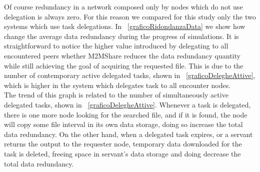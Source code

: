 Of course redundancy in a network composed only by nodes which do not use delegation is always zero. For this reason we compared for this study only the two systems which use task delegations. In \figurename~\ref{graficoRidondanzaData} we show how change the average data redundancy during the progress of simulations. It is straightforward to notice the higher value introduced by delegating to all encountered peers whether M2MShare reduces the data redundancy quantity while still achieving the goal of acquiring the requested file. This is due to the number of contemporary active delegated tasks, shown in \figurename~\ref{graficoDelegheAttive}, which is higher in the system which delegates task to all encounter nodes. 
\\
The trend of this graph is related to the number of simultaneously active delegated tasks, shown in \figurename~\ref{graficoDelegheAttive}. Whenever a task is delegated, there is one more node looking for the searched file, and if it is found, the node will copy some file interval in its own data storage, doing so increase the total data redundancy. On the other hand, when a delegated task expires, or a servant returns the output to the requester node, temporary data downloaded for the task is deleted, freeing space in servant's data storage and doing decrease the total data redundancy.

